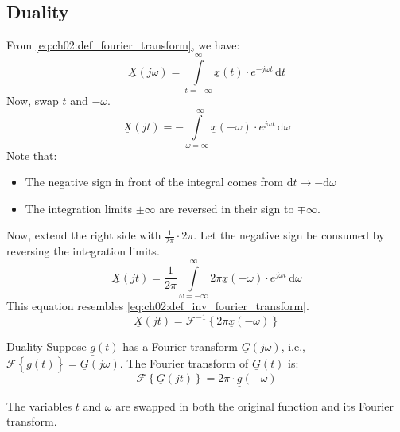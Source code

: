 \begin{refsection}
\subsection{Duality}

From \eqref{eq:ch02:def_fourier_transform}, we have:
\begin{equation*}
	\underline{X}(j \omega) = \int\limits_{t = -\infty}^{\infty} \underline{x}(t) \cdot e^{-j \omega t} \, \mathrm{d} t
\end{equation*}
Now, swap $t$ and $-\omega$.
\begin{equation}
	\underline{X}(j t) = - \int\limits_{\omega = \infty}^{-\infty} \underline{x}(-\omega) \cdot e^{j \omega t} \, \mathrm{d} \omega
\end{equation}
Note that:
\begin{itemize}
	\item The negative sign in front of the integral comes from $\mathrm{d} t \rightarrow - \mathrm{d} \omega$
	\item The integration limits $\pm \infty$ are reversed in their sign to $\mp \infty$.
\end{itemize}
Now, extend the right side with $\frac{1}{2 \pi} \cdot 2 \pi$. Let the negative sign be consumed by reversing the integration limits.
\begin{equation}
	\underline{X}(j t) = \frac{1}{2 \pi} \int\limits_{\omega = -\infty}^{\infty} 2 \pi \underline{x}(-\omega) \cdot e^{j \omega t} \, \mathrm{d} \omega
\end{equation}
This equation resembles \eqref{eq:ch02:def_inv_fourier_transform}.
\begin{equation}
	\underline{X}(j t) = \mathcal{F}^{-1} \left\{2 \pi \underline{x}(-\omega)\right\}
\end{equation}

\begin{definition}{Duality}
	Suppose $\underline{g}(t)$ has a Fourier transform $\underline{G}\left(j \omega\right)$, i.e., $\mathcal{F}\left\{\underline{g}(t)\right\} = \underline{G}\left(j \omega\right)$. The Fourier transform of $\underline{G}(t)$ is:
	\begin{equation}
		\mathcal{F}\left\{\underline{G}(j t)\right\} = 2 \pi \cdot \underline{g} \left(-\omega\right)
		\label{eq:ch02:op_duality}
	\end{equation}
	
	The variables $t$ and $\omega$ are swapped in both the original function and its Fourier transform.
\end{definition}


\end{refsection}
